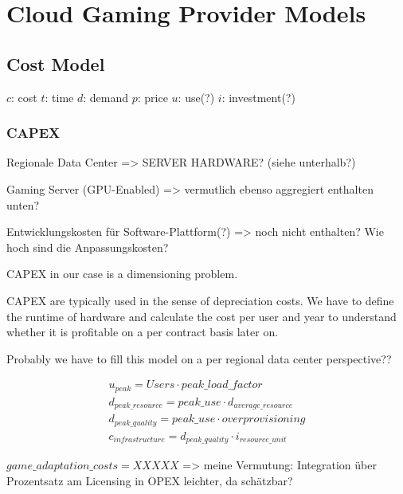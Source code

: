 \section{Cloud Gaming Provider Models}


\subsection{Cost Model}



$c$: cost
$t$: time
$d$: demand
$p$: price
$u$: use(?)
$i$: investment(?)

\subsubsection{CAPEX}

Regionale Data Center => SERVER HARDWARE? (siehe unterhalb?)

Gaming Server (GPU-Enabled) => vermutlich ebenso aggregiert enthalten unten?

Entwicklungskosten für Software-Plattform(?) => noch nicht enthalten? Wie hoch sind die Anpassungskosten?

CAPEX in our case is a dimensioning problem.

CAPEX are typically used in the sense of depreciation costs. We have to define the runtime of hardware and calculate the cost per user and year to understand whether it is profitable on a per contract basis later on.

Probably we have to fill this model on a per regional data center perspective??

\begin{align*}
u_{peak} = Users \cdot peak\_load\_factor \\
d_{peak\_resource} = peak\_use \cdot d_{average\_resource} \\
d_{peak\_quality} = peak\_use \cdot overprovisioning \\
c_{infrastructure} = d_{peak\_quality} \cdot i_{resource\_unit}
\end{align*}

$game\_adaptation\_costs = XXXXX$ => meine Vermutung: Integration über Prozentsatz am Licensing in OPEX leichter, da schätzbar?


